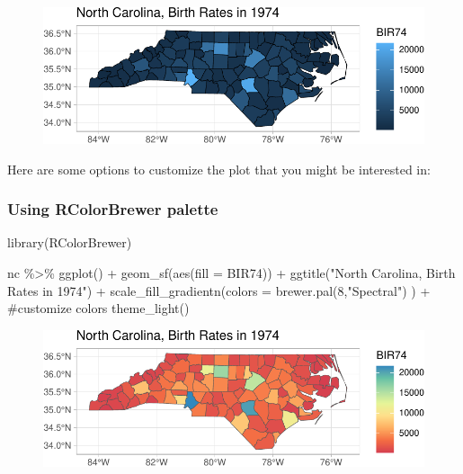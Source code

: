 \documentclass[
  letterpaper,
  DIV=11,
  numbers=noendperiod]{scrartcl}
\newenvironment{Shaded}{\begin{snugshade}}{\end{snugshade}}
\newcommand{\AttributeTok}[1]{\textcolor[rgb]{0.40,0.45,0.13}{#1}}
\newcommand{\CommentTok}[1]{\textcolor[rgb]{0.37,0.37,0.37}{#1}}
\newcommand{\DecValTok}[1]{\textcolor[rgb]{0.68,0.00,0.00}{#1}}
\newcommand{\FunctionTok}[1]{\textcolor[rgb]{0.28,0.35,0.67}{#1}}
\newcommand{\NormalTok}[1]{\textcolor[rgb]{0.00,0.23,0.31}{#1}}
\newcommand{\SpecialCharTok}[1]{\textcolor[rgb]{0.37,0.37,0.37}{#1}}
\newcommand{\StringTok}[1]{\textcolor[rgb]{0.13,0.47,0.30}{#1}}
\begin{document}
\begin{figure}[H]

{\centering \includegraphics{118_K_maps1_files/figure-pdf/unnamed-chunk-12-1.pdf}

}

\end{figure}

Here are some options to customize the plot that you might be interested
in:

\hypertarget{using-rcolorbrewer-palette}{%
\subsubsection{Using RColorBrewer
palette}\label{using-rcolorbrewer-palette}}

\begin{Shaded}
\begin{Highlighting}[]
\FunctionTok{library}\NormalTok{(RColorBrewer)}

\NormalTok{nc }\SpecialCharTok{\%\textgreater{}\%}
  \FunctionTok{ggplot}\NormalTok{() }\SpecialCharTok{+}
  \FunctionTok{geom\_sf}\NormalTok{(}\FunctionTok{aes}\NormalTok{(}\AttributeTok{fill =}\NormalTok{ BIR74)) }\SpecialCharTok{+}
  \FunctionTok{ggtitle}\NormalTok{(}\StringTok{"North Carolina, Birth Rates in 1974"}\NormalTok{) }\SpecialCharTok{+}
  \FunctionTok{scale\_fill\_gradientn}\NormalTok{(}\AttributeTok{colors =} \FunctionTok{brewer.pal}\NormalTok{(}\DecValTok{8}\NormalTok{,}\StringTok{"Spectral"}\NormalTok{) ) }\SpecialCharTok{+} \CommentTok{\#customize colors}
  \FunctionTok{theme\_light}\NormalTok{()}
\end{Highlighting}
\end{Shaded}

\begin{figure}[H]

{\centering \includegraphics{118_K_maps1_files/figure-pdf/unnamed-chunk-13-1.pdf}

}

\end{figure}
\end{document}
